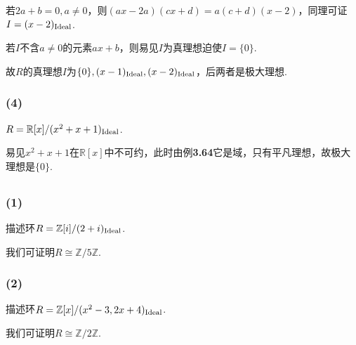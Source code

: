 若$2a+b=0, a\neq 0$，则$(ax-2a)(cx+d)=a(c+d)(x-2)$，同理可证$I=(x-2)_{\operatorname{Ideal}}$.

若$I$不含$a\neq 0$的元素$ax+b$，则易见$I$为真理想迫使$I=\{0\}$.

故$R$的真理想$I$为$\{0\}, (x-1)_{\operatorname{Ideal}}, (x-2)_{\operatorname{Ideal}}$，后两者是极大理想.

\subsubsection{(4)}
$R=\mathbb{R}[x]/(x^2+x+1)_{\operatorname{Ideal}}$.

\jie 易见$x^2+x+1$在$\mathbb{R}[x]$中不可约，此时由{\heiti 例}\textbf{3.64}它是域，只有平凡理想，故极大理想是$\{0\}$.

\subsection{}
\subsubsection{(1)}
描述环$R=\mathbb{Z}[i]/(2+i)_{\operatorname{Ideal}}$.

\jie 我们可证明$R\cong \mathbb{Z}/5\mathbb{Z}$.


\subsubsection{(2)}
描述环$R=\mathbb{Z}[x]/(x^2-3,2x+4)_{\operatorname{Ideal}}$.

\jie 我们可证明$R\cong \mathbb{Z}/2\mathbb{Z}$.



